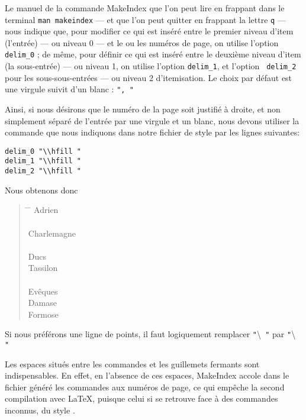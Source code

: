 Le manuel de la commande MakeIndex que l'on peut lire en frappant dans le terminal \verb+man makeindex+ --- et que l'on peut quitter en frappant la lettre  \verb|q| --- nous indique que, pour modifier ce qui est inséré entre le premier niveau d'item (l'entrée) --- ou niveau 0 --- et le ou les numéros de page, on utilise l'option \verb|delim_0| ; de même, pour définir ce qui est inséré entre le deuxième niveau d'item (la sous-entrée) --- ou niveau 1, on utilise l'option \verb+delim_1+, et l'option \verb| delim_2| pour les sous-sous-entrées --- ou niveau 2 d'itemisation. Le choix par défaut est une virgule suivit d'un blanc : \verb|", "|

Ainsi, si nous désirons que le numéro de la page soit justifié à droite, et non simplement séparé de l'entrée par une virgule et un blanc, nous devons utiliser la commande  que nous indiquons dans notre fichier de style par les lignes suivantes:

\begin{verbatim}
delim_0 "\\hfill "
delim_1 "\\hfill "
delim_2 "\\hfill "
\end{verbatim}

Nous obtenons donc 

\begin{quotation}
\begin{tabbing}
\hspace{0,5cm}  \=  \hspace{3cm} \= \kill
Adrien\> \\
\\
Charlemagne \> \\
\\
Ducs \\
\> Tassilon\\
\\
Evêques \\
\> Damase \\
\> Formose\\
\end{tabbing}
\end{quotation}

Si nous préférons une ligne de points, il faut logiquement remplacer \verb|"|\textbackslash{}\verb| "| par \verb|"|\textbackslash{}\verb| "|

\begin{attention}
Les espaces situés entre les commandes et les guillemets fermants sont indispensables. En effet, en l'absence de ces espaces, MakeIndex accole dans le fichier  généré les commandes aux numéros de page, ce qui empêche la second compilation avec \LaTeX, puisque celui si se retrouve face à des commandes inconnus, du style .
\end{attention}


